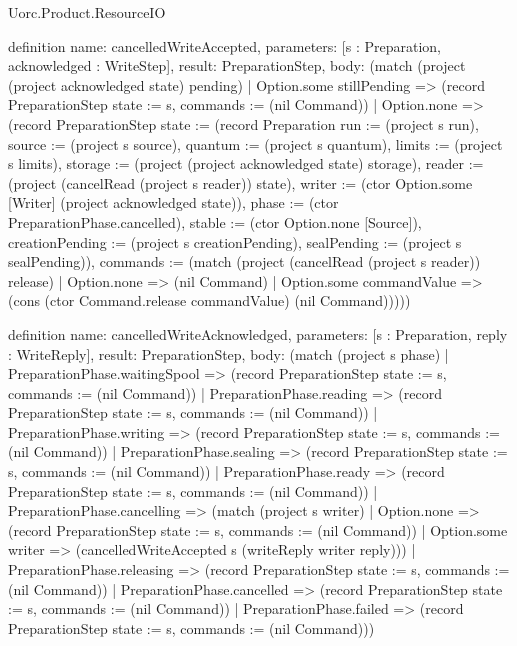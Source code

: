 \begin{lexlean}{Uorc.Product.ResourceIO}
\begin{semanticmodule}
definition{
  name: cancelledWriteAccepted,
  parameters: [s : Preparation, acknowledged : WriteStep],
  result: PreparationStep,
  body: (match (project (project acknowledged state) pending)
    | Option.some stillPending => (record PreparationStep {state := s, commands := (nil Command)})
    | Option.none => (record PreparationStep {state := (record Preparation {run := (project s run), source := (project s source), quantum := (project s quantum), limits := (project s limits), storage := (project (project acknowledged state) storage), reader := (project (cancelRead (project s reader)) state), writer := (ctor Option.some [Writer] (project acknowledged state)), phase := (ctor PreparationPhase.cancelled), stable := (ctor Option.none [Source]), creationPending := (project s creationPending), sealPending := (project s sealPending)}), commands := (match (project (cancelRead (project s reader)) release)
      | Option.none => (nil Command)
      | Option.some commandValue => (cons (ctor Command.release commandValue) (nil Command)))}))
}

definition{
  name: cancelledWriteAcknowledged,
  parameters: [s : Preparation, reply : WriteReply],
  result: PreparationStep,
  body: (match (project s phase)
    | PreparationPhase.waitingSpool => (record PreparationStep {state := s, commands := (nil Command)})
    | PreparationPhase.reading => (record PreparationStep {state := s, commands := (nil Command)})
    | PreparationPhase.writing => (record PreparationStep {state := s, commands := (nil Command)})
    | PreparationPhase.sealing => (record PreparationStep {state := s, commands := (nil Command)})
    | PreparationPhase.ready => (record PreparationStep {state := s, commands := (nil Command)})
    | PreparationPhase.cancelling => (match (project s writer)
      | Option.none => (record PreparationStep {state := s, commands := (nil Command)})
      | Option.some writer => (cancelledWriteAccepted s (writeReply writer reply)))
    | PreparationPhase.releasing => (record PreparationStep {state := s, commands := (nil Command)})
    | PreparationPhase.cancelled => (record PreparationStep {state := s, commands := (nil Command)})
    | PreparationPhase.failed => (record PreparationStep {state := s, commands := (nil Command)}))
}


\end{semanticmodule}
\end{lexlean}

